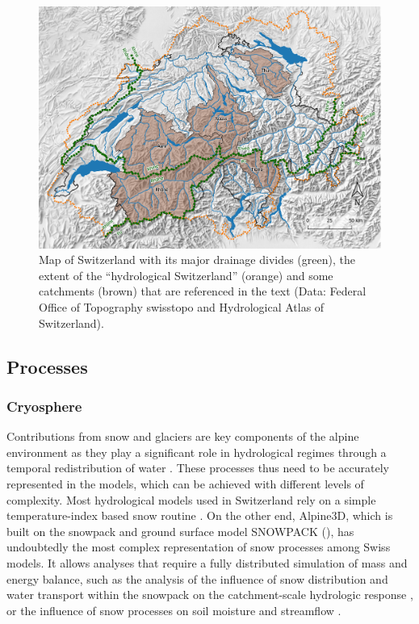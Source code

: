 \documentclass[10pt,a4paper]{article}
\begin{document}
\begin{figure}[htb]
	\begin{center}
		\includegraphics[width=0.95\columnwidth]{figures/map}
		\caption{{Map of Switzerland with its major drainage divides (green), the extent of the ``hydrological Switzerland'' (orange) and some catchments (brown) that are referenced in the text (Data: Federal Office of Topography swisstopo and Hydrological Atlas of Switzerland). \label{fig:map}
		}}
	\end{center}
\end{figure}


\subsection{Processes}
\label{sec:context:processes}


\subsubsection{Cryosphere}
\label{sec:context:cryosphere}

Contributions from snow and glaciers are key components of the alpine environment as they play a significant role in hydrological regimes through a temporal redistribution of water \citep{Barnett2005}. These processes thus need to be accurately represented in the models, which can be achieved with different levels of complexity. Most hydrological models used in Switzerland rely on a simple temperature-index based snow routine \citep[see for example][]{Jenicek2018}. On the other end, Alpine3D, which is built on the snowpack and ground surface model SNOWPACK (\citealt{Bartelt2002, Lehning2002a, Lehning2002b}), has undoubtedly the most complex representation of snow processes among Swiss models. It allows analyses that require a fully distributed simulation of mass and energy balance, such as the analysis of the influence of snow distribution and water transport within the snowpack on the catchment-scale hydrologic response \citep{Brauchli2017}, or the influence of snow processes on soil moisture and streamflow \citep{Wever2017}.
\end{document}
